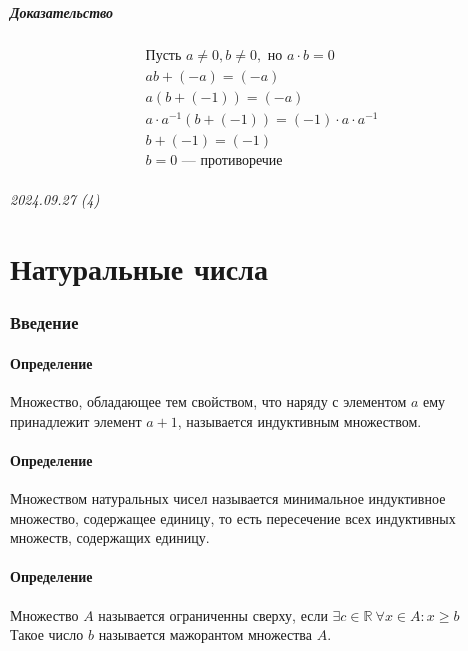 \documentclass{article}
\begin{document}
\subsubsection{Доказательство}
\begin{gather*}
    \text{Пусть } a \neq 0, b \neq 0, \text{ но } a \cdot b = 0 \\
    ab + (-a) = (-a) \\
    a(b + (-1)) = (-a) \\
    a \cdot a^{-1} (b + (-1)) = (-1) \cdot a \cdot a^{-1} \\
    b + (-1) = (-1) \\
    b = 0 \text{ --- противоречие}
\end{gather*}




\newpage
\paragraph{2024.09.27 (4)}
\part{Натуральные числа}

\section{Введение}

\subsection{Определение}
Множество, обладающее тем свойством, что наряду с элементом $a$ ему принадлежит элемент $a + 1$, называется индуктивным множеством.


\subsection{Определение}
Множеством натуральных чисел называется минимальное индуктивное множество, содержащее единицу, то есть пересечение всех индуктивных множеств, содержащих единицу.


\subsection{Определение}
Множество $A$ называется ограниченны сверху, если $\exists c \in \mathbb{R} ~ \forall x \in A: x \ge b$ \\
Такое число $b$ называется мажорантом множества $A$.
\end{document}
